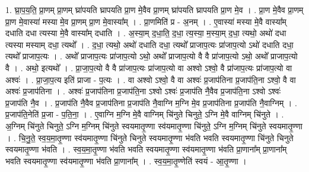 \documentclass[17pt]{extarticle}
\begin{document}
1. घ्रा॒प॒य॒ति॒ प्रा॒णम् प्रा॒णम् घ्रा॑पयति घ्रापयति प्रा॒ण मे॒वैव प्रा॒णम् घ्रा॑पयति घ्रापयति प्रा॒ण मे॒व । . प्रा॒ण मे॒वैव प्रा॒णम् प्रा॒ण मे॒वास्या॑ मस्या मे॒व प्रा॒णम् प्रा॒ण मे॒वास्या᳚म् । . प्रा॒णमिति॑ प्र - अ॒नम् । . ए॒वास्या॑ मस्या मे॒वै वास्या᳚म् दधाति दधा त्यस्या मे॒वै वास्या᳚म् दधाति । . अ॒स्या॒म् द॒धा॒ति॒ द॒धा॒ त्य॒स्या॒ म॒स्या॒म् द॒धा॒ त्यथो॒ अथो॑ दधा त्यस्या मस्याम् दधा॒ त्यथो᳚ । . द॒धा॒ त्यथो॒ अथो॑ दधाति दधा॒ त्यथो᳚ प्राजाप॒त्यः प्रा॑जाप॒त्यो ऽथो॑ दधाति दधा॒ त्यथो᳚ प्राजाप॒त्यः । . अथो᳚ प्राजाप॒त्यः प्रा॑जाप॒त्यो ऽथो॒ अथो᳚ प्राजाप॒त्यो वै वै प्रा॑जाप॒त्यो ऽथो॒ अथो᳚ प्राजाप॒त्यो वै । . अथो॒ इत्यथो᳚ । . प्रा॒जा॒प॒त्यो वै वै प्रा॑जाप॒त्यः प्रा॑जाप॒त्यो वा अश्वो ऽश्वो॒ वै प्रा॑जाप॒त्यः प्रा॑जाप॒त्यो वा अश्वः॑ । . प्रा॒जा॒प॒त्य इति॑ प्राजा - प॒त्यः । . वा अश्वो ऽश्वो॒ वै वा अश्वः॑ प्र॒जाप॑तिना प्र॒जाप॑ति॒ना ऽश्वो॒ वै वा अश्वः॑ प्र॒जाप॑तिना । . अश्वः॑ प्र॒जाप॑तिना प्र॒जाप॑ति॒ना ऽश्वो ऽश्वः॑ प्र॒जाप॑ति नै॒वैव प्र॒जाप॑ति॒ना ऽश्वो ऽश्वः॑ प्र॒जाप॑ति नै॒व । . प्र॒जाप॑ति नै॒वैव प्र॒जाप॑तिना प्र॒जाप॑ति नै॒वाग्नि म॒ग्नि मे॒व प्र॒जाप॑तिना प्र॒जाप॑ति नै॒वाग्निम् । . प्र॒जाप॑ति॒नेति॑ प्र॒जा - प॒ति॒ना॒ । . ए॒वाग्नि म॒ग्नि मे॒वै वाग्निम् चि॑नुते चिनुते॒ ऽग्नि मे॒वै वाग्निम् चि॑नुते । . अ॒ग्निम् चि॑नुते चिनुते॒ ऽग्नि म॒ग्निम् चि॑नुते स्वयमातृ॒ण्णा स्व॑यमातृ॒ण्णा चि॑नुते॒ ऽग्नि म॒ग्निम् चि॑नुते स्वयमातृ॒ण्णा । . चि॒नु॒ते॒ स्व॒य॒मा॒तृ॒ण्णा स्व॑यमातृ॒ण्णा चि॑नुते चिनुते स्वयमातृ॒ण्णा भ॑वति भवति स्वयमातृ॒ण्णा चि॑नुते चिनुते स्वयमातृ॒ण्णा भ॑वति । . स्व॒य॒मा॒तृ॒ण्णा भ॑वति भवति स्वयमातृ॒ण्णा स्व॑यमातृ॒ण्णा भ॑वति प्रा॒णाना᳚म् प्रा॒णाना᳚म् भवति स्वयमातृ॒ण्णा स्व॑यमातृ॒ण्णा भ॑वति प्रा॒णाना᳚म् । . स्व॒य॒मा॒तृ॒ण्णेति॑ स्वयं - आ॒तृ॒ण्णा । \newline
\end{document}
